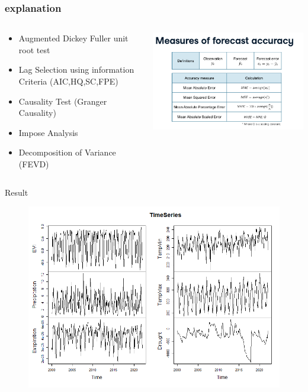 \documentclass[11pt]{beamer}
\begin{document}
\begin{frame}
	\frametitle{explanation}
	\begin{columns}
		\begin{column}{0.5\textwidth}
			\begin{itemize}
				\item Augmented Dickey Fuller unit root test
				\item Lag Selection using information Criteria (AIC,HQ,SC,FPE)
				\item Causality Test (Granger Causality)
				\item Impose Analysis
				\item Decomposition of Variance (FEVD)
			\end{itemize}
		\end{column}
		\begin{column}{0.5\textwidth}  %
					\begin{center}
						\includegraphics[width=0.7\linewidth]{images/Accuracy}
					\end{center}
		\end{column}
	\end{columns}
\end{frame}
\begin{frame}{Result}
\begin{figure}
	\centering
	\includegraphics[width=0.7\linewidth]{images/TimeSeries}
	\caption{}
	\label{fig:timeseries}
\end{figure}
\end{frame}
\end{document}
